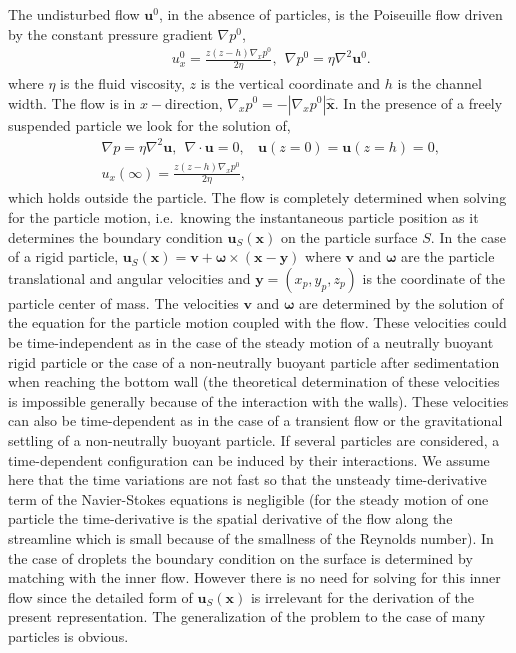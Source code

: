 The undisturbed flow $\bm u^0$, in the absence of  particles, is the Poiseuille flow driven by the constant pressure gradient $\nabla p^0$,
\begin{eqnarray}&&
u^0_x=\frac{z(z-h)\nabla_x p^0}{2\eta},\ \ \nabla p^0=\eta\nabla^2\bm u^0.\label{ps}
\end{eqnarray}
where $\eta$ is the fluid viscosity, $z$ is the vertical coordinate and $h$ is the channel width. The flow is in $x-$direction, $\nabla_x p^0=-|\nabla_x p^0| \bm{\hat x}$. In the presence of a freely suspended particle we look for the solution of,
\begin{eqnarray}&&%
\nabla p=\eta\nabla^2\bm u,\ \ \nabla\cdot\bm u=0,\ \ \ \ \bm u(z=0)=\bm u(z=h)=0,\nonumber\\&&%
u_x(\infty)=\frac{z(z-h)\nabla_x p^0}{2\eta},
\label{ds}
\end{eqnarray}
which holds outside the particle. The flow is completely determined when solving for the particle motion, i.e.\ knowing the instantaneous particle position as it determines the boundary condition $\bm u_{S}(\bm x)$ on the 
 particle surface $S$. In the case of a rigid particle, $\bm u_{S}(\bm x)=\bm v+\bm \omega\times (\bm x-\bm y)$ where $\bm v$ and $
\bm \omega$ are the particle translational and angular velocities  and $\bm y=(x_p, y_p, z_p)$ is the coordinate of the particle center of mass. The velocities $\bm v$ and $\bm \omega$ are determined by the solution of the equation for the particle motion coupled with the flow. These velocities could be time-independent as in the case of the steady motion of a neutrally buoyant rigid particle or the case of a non-neutrally buoyant particle after sedimentation when reaching the bottom wall (the theoretical determination of these velocities is impossible generally because of the interaction with the walls). These velocities can also be time-dependent as in the case of
a transient flow  or the gravitational settling of a non-neutrally buoyant particle. If several particles are considered, a time-dependent configuration can be induced by their interactions. We assume here that the time variations are not fast so that the unsteady time-derivative term of the Navier-Stokes equations is negligible (for the steady motion of one particle the time-derivative is the spatial derivative of the flow along the streamline which is small  because of the smallness of the Reynolds number). In the case of droplets the boundary condition on the surface is determined by matching with the inner flow. However there is no need for solving for this inner flow since the detailed form of $\bm u_{S}(\bm x)$ is irrelevant for the derivation of the present representation. The generalization of the problem to the case of many particles is obvious.

